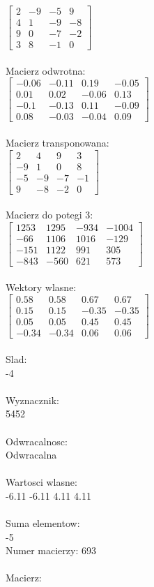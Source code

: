 \documentclass[a4paper,12pt]{article}
\begin{document}
$\begin{bmatrix} 2&-9&-5&9\\4&1&-9&-8\\9&0&-7&-2\\3&8&-1&0 \end{bmatrix}$
\\
\\
Macierz odwrotna:\\

$\begin{bmatrix} -0.06&-0.11&0.19&-0.05\\0.01&0.02&-0.06&0.13\\-0.1&-0.13&0.11&-0.09\\0.08&-0.03&-0.04&0.09 \end{bmatrix}$
\\
\\
Macierz transponowana:\\

$\begin{bmatrix} 2&4&9&3\\-9&1&0&8\\-5&-9&-7&-1\\9&-8&-2&0 \end{bmatrix}$
\\
\\
Macierz do potegi 3:\\

$\begin{bmatrix} 1253&1295&-934&-1004\\-66&1106&1016&-129\\-151&1122&991&305\\-843&-560&621&573 \end{bmatrix}$
\\
\\
Wektory wlasne:\\

$\begin{bmatrix} 0.58&0.58&0.67&0.67\\0.15&0.15&-0.35&-0.35\\0.05&0.05&0.45&0.45\\-0.34&-0.34&0.06&0.06 \end{bmatrix}$
\\
\\
Slad:\\
-4
\\
\\
Wyznacznik:\\
5452
\\
\\
Odwracalnosc:\\
Odwracalna
\\
\\
Wartosci wlasne:\\
-6.11 -6.11 4.11 4.11
\\
\\
Suma elementow:\\
-5
\\
\newpage
Numer macierzy:
693
\\
\\
Macierz:\\
\end{document}

